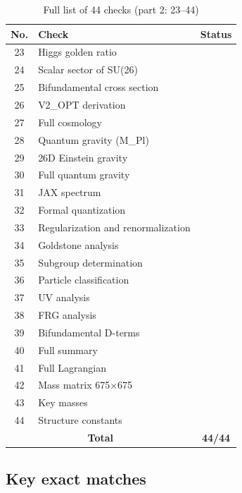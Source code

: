 \documentclass[12pt,a4paper,twoside]{article}
\newcommand{\checkmarkgreen}{\textcolor{emerald}{\checkmark}}
\theoremstyle{definition}
\begin{document}
\begin{table}[H]
\centering
\small
\caption{Full list of 44 checks (part 2: 23--44)}
\label{tab:44_breakdown_b}
\begin{tabular}{c|l|c}
\toprule
\textbf{No.} & \textbf{Check} & \textbf{Status} \\
\midrule
23 & Higgs golden ratio & \checkmarkgreen \\
24 & Scalar sector of SU(26) & \checkmarkgreen \\
25 & Bifundamental cross section & \checkmarkgreen \\
26 & V2\_OPT derivation & \checkmarkgreen \\
27 & Full cosmology & \checkmarkgreen \\
28 & Quantum gravity (M\_Pl) & \checkmarkgreen \\
29 & 26D Einstein gravity & \checkmarkgreen \\
30 & Full quantum gravity & \checkmarkgreen \\
31 & JAX spectrum & \checkmarkgreen \\
32 & Formal quantization & \checkmarkgreen \\
33 & Regularization and renormalization & \checkmarkgreen \\
34 & Goldstone analysis & \checkmarkgreen \\
35 & Subgroup determination & \checkmarkgreen \\
36 & Particle classification & \checkmarkgreen \\
37 & UV analysis & \checkmarkgreen \\
38 & FRG analysis & \checkmarkgreen \\
39 & Bifundamental D-terms & \checkmarkgreen \\
40 & Full summary & \checkmarkgreen \\
41 & Full Lagrangian & \checkmarkgreen \\
42 & Mass matrix 675×675 & \checkmarkgreen \\
43 & Key masses & \checkmarkgreen \\
44 & Structure constants & \checkmarkgreen \\
\midrule
\multicolumn{2}{c|}{\textbf{Total}} & \textbf{\checkmarkgreen 44/44} \\
\bottomrule
\end{tabular}
\end{table}

\subsection{Key exact matches}
\end{document}
